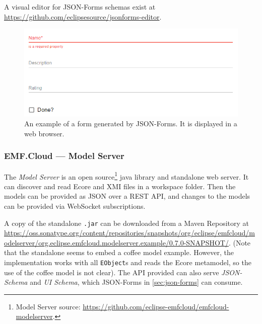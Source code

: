 A visual editor for JSON-Forms schemas exist at \href{https://github.com/eclipsesource/jsonforms-editor}{https://github.com/eclipsesource/jsonforms-editor}.

\begin{figure}[htbp]  %
  \centering
  \includegraphics[width=.8\textwidth]{figures/json-forms-example}
  \caption[JSON-Forms Example]{An example of a form generated by JSON-Forms. It is displayed in a web browser.}\label{fig:json-forms-example}
\end{figure}

\subsubsection{EMF.Cloud --- Model Server}
The \emph{Model Server} is an \gls{open source}\footnote{Model Server source: \href{https://github.com/eclipse-emfcloud/emfcloud-modelserver}{https://github.com/eclipse-emfcloud/emfcloud-modelserver}.} java library and standalone web server.
It can discover and read \gls{Ecore} and \gls{XMI} files in a workspace folder.
Then the models can be provided as \gls{JSON} over a \gls{REST} \acrshort{API}, and changes to the models can be provided via \gls{WebSocket} subscriptions.~\cite{eugenneufeldEclipseemfcloudEmfcloudmodelserver2020}

A copy of the standalone \texttt{.jar} can be downloaded from a Maven Repository at \href{https://oss.sonatype.org/content/repositories/snapshots/org/eclipse/emfcloud/modelserver/org.eclipse.emfcloud.modelserver.example/0.7.0-SNAPSHOT/}{https://oss.sonatype.org/content/repositories/snapshots/org/eclipse/emfcloud/modelserver/org.eclipse.emfcloud.modelserver.example/0.7.0-SNAPSHOT/}.
(Note that the standalone seems to embed a coffee model example.
However, the implementation works with all \texttt{EObject}s and reads the \gls{Ecore} metamodel, so the use of the coffee model is not clear).
The \acrshort{API} provided can also serve \emph{JSON-Schema} and \emph{UI Schema}, which JSON-Forms in \cref{sec:json-forms} can consume.

